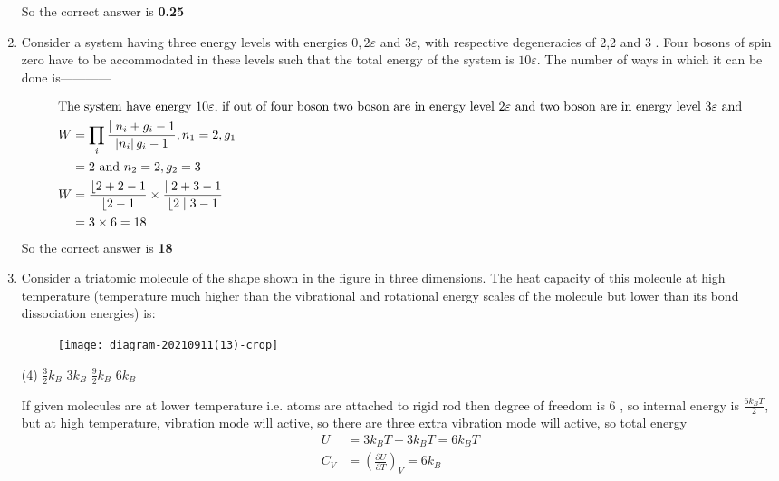 \begin{enumerate}
\begin{answer}
		So the correct answer is \textbf{0.25}
	\end{answer}
	\item Consider a system having three energy levels with energies $0,2 \varepsilon$ and $3 \varepsilon$, with respective degeneracies of 2,2 and 3 . Four bosons of spin zero have to be accommodated in these levels such that the total energy of the system is $10 \varepsilon$. The number of ways in which it can be done is------------
	{}
	\begin{answer}
		\begin{align*}
		\intertext{The system have energy $10 \varepsilon$, if out of four boson two boson are in energy level $2 \varepsilon$ and two boson are in energy level $3 \varepsilon$ and}W&=\prod_{i} \frac{\mid n_{i}+g_{i}-1}{\left|n_{i}\right| g_{i}-1}, n_{1}=2, g_{1}\\&=2\text{ and }n_{2}=2, g_{2}=3\\
		W&=\frac{\lfloor 2+2-1}{\lfloor 2-1} \times \frac{\mid 2+3-1}{\lfloor 2 \mid 3-1}\\&=3 \times 6=18
		\end{align*}
		So the correct answer is \textbf{18}
	\end{answer}
	\item Consider a triatomic molecule of the shape shown in the figure in three dimensions. The heat capacity of this molecule at high temperature (temperature much higher than the vibrational and rotational energy scales of the molecule but lower than its bond dissociation energies) is:
	{}
	\begin{figure}[H]
		\centering
		\texttt{[image: diagram-20210911(13)-crop]}
	\end{figure}
	\begin{tasks}(4)
		\task[\textbf{a.}] $\frac{3}{2} k_{B}$
		\task[\textbf{b.}] $3 k_{B}$
		\task[\textbf{c.}] $\frac{9}{2} k_{B}$
		\task[\textbf{d.}] $6 k_{B}$
	\end{tasks}
	\begin{answer}
		If given molecules are at lower temperature i.e. atoms are attached to rigid rod then degree of freedom is 6 , so internal energy is $\frac{6 k_{B} T}{2}$, but at high temperature, vibration mode will active, so there are three extra vibration mode will active, so total energy
		\begin{align*}
		U&=3 k_{B} T+3 k_{B} T=6 k_{B} T\\
		C_{V}&=\left(\frac{\partial U}{\partial T}\right)_{V}=6 k_{B}

\end{align*}
\end{answer}
\end{enumerate}
